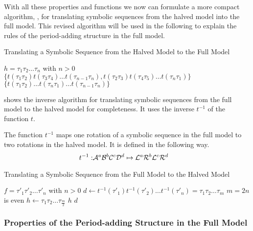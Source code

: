 With all these properties and functions we now can formulate a more compact algorithm, , for translating symbolic sequences from the halved model into the full model.
This revised algorithm will be used in the following to explain the rules of the period-adding structure in the full model.

\begin{algorithm}
	\caption{Translating a Symbolic Sequence from the Halved Model to the Full Model}\label{alg:halved.to.full}
	\begin{algorithmic}
		\Require $h = \tau_1\tau_2 \dots \tau_n$ with $n > 0$
		\State \Return $\{t(\tau_1\tau_2) t(\tau_3\tau_4) \dots t(\tau_{n-1}\tau_n), t(\tau_2\tau_3) t(\tau_4\tau_5) \dots t(\tau_n\tau_1)\}$
		\State \Return $\{t(\tau_1\tau_2) \dots t(\tau_{n}\tau_1) \dots t(\tau_{n-1}\tau_n)\}$
		\EndIf
	\end{algorithmic}
\end{algorithm}

 shows the inverse algorithm for translating symbolic sequences from the full model to the halved model for completeness.
It uses the inverse $t^{-1}$ of the function $t$.

\begin{definition}
	The function $t^{-1}$ maps one rotation of a symbolic sequence in the full model to two rotations in the halved model.
	It is defined in the following way.
	\begin{align}
		t^{-1}: & \mathcal{A}^a\mathcal{B}^b\mathcal{C}^c\mathcal{D}^d \mapsto \mathcal{L}^a\mathcal{R}^b\mathcal{L}^c\mathcal{R}^d
	\end{align}
\end{definition}

\begin{algorithm}
	\caption{Translating a Symbolic Sequence from the Full Model to the Halved Model}\label{alg:full.to.halved}
	\begin{algorithmic}
		\Require $f = \tau'_1\tau'_2 \dots \tau'_n$ with $n > 0$
		\State $d \gets t^{-1}(\tau'_1)t^{-1}(\tau'_2) \dots t^{-1}(\tau'_n) = \tau_1\tau_2 \dots \tau_m$
		\Comment $m = 2n$ is even
		\State $h \gets \tau_1\tau_2 \dots \tau_{\frac{m}{2}}$
		\If{$d = h^2$}
		\State \Return $h$
		\ElsIf{$d \neq h^2$}
		\State \Return $d$
		\EndIf
	\end{algorithmic}
\end{algorithm}

\subsubsection{Properties of the Period-adding Structure in the Full Model}

